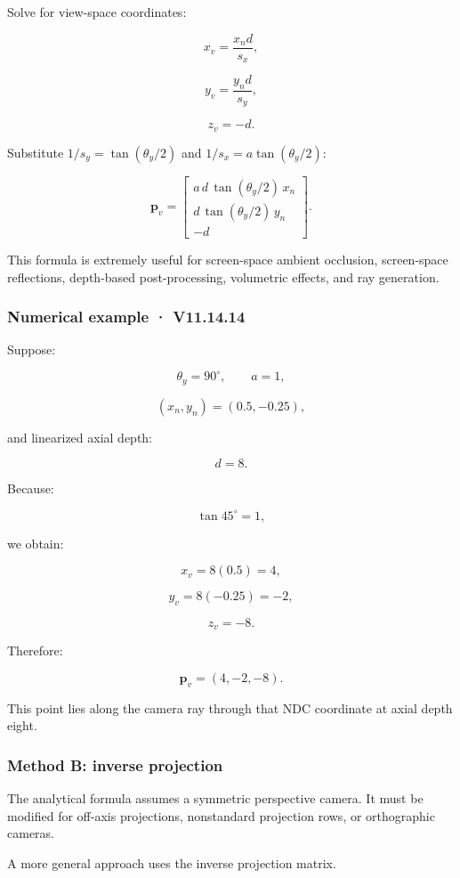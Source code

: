 Solve for view-space coordinates:

\[ x_v=\frac{x_nd}{s_x}, \]

\[ y_v=\frac{y_nd}{s_y}, \]

\[ z_v=-d. \]

Substitute \(1/s_y=\tan(\theta_y/2)\) and \(1/s_x=a\tan(\theta_y/2)\):

\[ \boxed{ \mathbf p_v= \begin{bmatrix} a\,d\,\tan(\theta_y/2)\,x_n\\ d\,\tan(\theta_y/2)\,y_n\\ -d \end{bmatrix}. } \]

This formula is extremely useful for screen-space ambient occlusion, screen-space reflections, depth-based post-processing, volumetric effects, and ray generation.

\subsubsection{Numerical example · V11.14.14}\label{numerical-example-v11.14.14}

Suppose:

\[ \theta_y=90^\circ,\qquad a=1, \]

\[ (x_n,y_n)=(0.5,-0.25), \]

and linearized axial depth:

\[ d=8. \]

Because:

\[ \tan45^\circ=1, \]

we obtain:

\[ x_v=8(0.5)=4, \]

\[ y_v=8(-0.25)=-2, \]

\[ z_v=-8. \]

Therefore:

\[ \boxed{\mathbf p_v=(4,-2,-8)}. \]

This point lies along the camera ray through that NDC coordinate at axial depth eight.

\subsubsection{Method B: inverse projection}\label{method-b-inverse-projection}

The analytical formula assumes a symmetric perspective camera. It must be modified for off-axis projections, nonstandard projection rows, or orthographic cameras.

A more general approach uses the inverse projection matrix.

